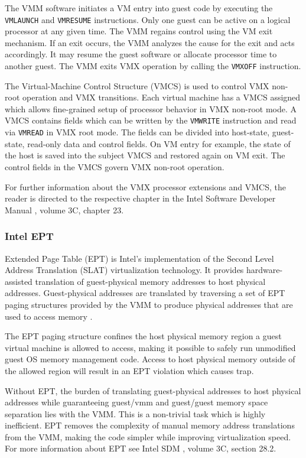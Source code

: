 The VMM software initiates a VM entry into guest code by executing the
\texttt{VMLAUNCH} and \texttt{VMRESUME} instructions. Only one guest can be
active on a logical processor at any given time. The VMM regains control using
the VM exit mechanism. If an exit occurs, the VMM analyzes the cause for the
exit and acts accordingly. It may resume the guest software or allocate
processor time to another guest. The VMM exits VMX operation by calling the
\texttt{VMXOFF} instruction.

The Virtual-Machine Control Structure (VMCS) is used to control VMX
non-root operation and VMX transitions. Each virtual machine has a VMCS
assigned which allows fine-grained setup of processor behavior in VMX non-root
mode. A VMCS contains fields which can be written by the
\texttt{VMWRITE} instruction and read via
\texttt{VMREAD} in VMX root mode. The fields can be divided into
host-state, guest-state, read-only data and control fields. On VM entry for
example, the state of the host is saved into the subject VMCS and restored
again on VM exit. The control fields in the VMCS govern VMX non-root operation.

For further information about the VMX processor extensions and VMCS, the reader
is directed to the respective chapter in the Intel Software Developer
Manual \cite{IntelSDM}, volume 3C, chapter 23.

\subsubsection{Intel EPT}\label{subsubsec:ept}
Extended Page Table (EPT) is Intel's implementation of the Second
Level Address Translation (SLAT) virtualization technology. It
provides hardware-assisted translation of guest-physical memory addresses to
host physical addresses. Guest-physical addresses are translated by traversing a
set of EPT paging structures provided by the VMM to produce physical addresses
that are used to access memory \cite{IntelSDM}.

The EPT paging structure confines the host physical memory region a guest
virtual machine is allowed to access, making it possible to safely run
unmodified guest OS memory management code. Access to host physical memory
outside of the allowed region will result in an EPT violation which causes trap.

Without EPT, the burden of translating guest-physical addresses to host physical
addresses while guaranteeing guest/vmm and guest/guest memory space separation
lies with the VMM. This is a non-trivial task which is highly inefficient. EPT
removes the complexity of manual memory address translations from the VMM,
making the code simpler while improving virtualization speed. For more
information about EPT see Intel SDM \cite{IntelSDM}, volume 3C, section 28.2.

